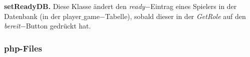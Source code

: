 \documentclass[12pt, a4paper]{article}
\begin{document}
\vspace{0,3 cm}

\textbf{setReadyDB.}
Diese Klasse ändert den \textit{ready}$-$Eintrag eines Spielers in der Datenbank (in der player$\_$game$-$Tabelle), sobald dieser in der \textit{GetRole} auf den \textit{bereit}$-$Button gedrückt hat.

		\subsubsection{php-Files}
		
\end{document}
